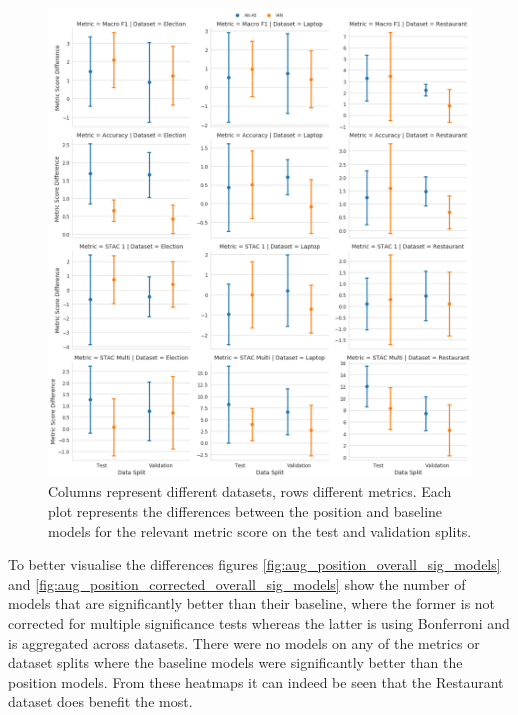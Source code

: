 
\begin{figure}[h!]
    \centering
    \includegraphics[scale=0.32]{images/augmentation/methods_performance/Position_Encoding/position_baseline_overall_differences.png}
    \caption{Columns represent different datasets, rows different metrics. Each plot represents the differences between the position and baseline models for the relevant metric score on the test and validation splits.}
    \label{fig:aug_position_baseline_overall_differences}
\end{figure}

To better visualise the differences figures \ref{fig:aug_position_overall_sig_models} and \ref{fig:aug_position_corrected_overall_sig_models} show the number of models that are significantly better than their baseline, where the former is not corrected for multiple significance tests whereas the latter is using Bonferroni and is aggregated across datasets. There were no models on any of the metrics or dataset splits where the baseline models were significantly better than the position models. From these heatmaps it can indeed be seen that the Restaurant dataset does benefit the most.%

